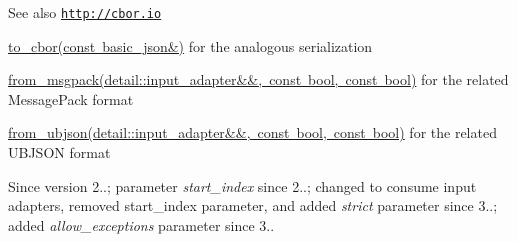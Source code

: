 \begin{DoxySeeAlso}{See also}
\href{http://cbor.io}{\tt http\+://cbor.\+io} 

\mbox{\hyperlink{classnlohmann_1_1basic__json_a2566783e190dec524bf3445b322873b8}{to\+\_\+cbor(const basic\+\_\+json\&)}} for the analogous serialization 

\mbox{\hyperlink{classnlohmann_1_1basic__json_a11458b7982adba51bc634f2f8c961e9b}{from\+\_\+msgpack(detail\+::input\+\_\+adapter\&\&, const bool, const bool)}} for the related Message\+Pack format 

\mbox{\hyperlink{classnlohmann_1_1basic__json_a1ed52b463d2ef14c85ed076467168c72}{from\+\_\+ubjson(detail\+::input\+\_\+adapter\&\&, const bool, const bool)}} for the related U\+B\+J\+S\+ON format
\end{DoxySeeAlso}
\begin{DoxySince}{Since}
version 2..; parameter {\itshape start\+\_\+index} since 2..; changed to consume input adapters, removed start\+\_\+index parameter, and added {\itshape strict} parameter since 3..; added {\itshape allow\+\_\+exceptions} parameter since 3.. 
\end{DoxySince}
\mbox{\label{classnlohmann_1_1basic__json_a11458b7982adba51bc634f2f8c961e9b}} 
